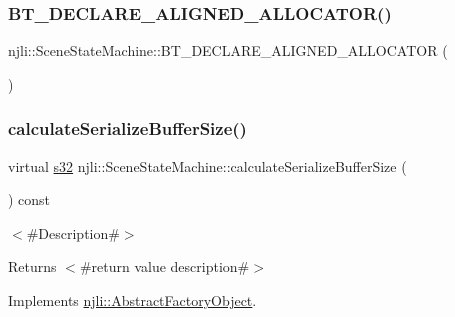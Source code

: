\subsubsection{\texorpdfstring{B\+T\+\_\+\+D\+E\+C\+L\+A\+R\+E\+\_\+\+A\+L\+I\+G\+N\+E\+D\+\_\+\+A\+L\+L\+O\+C\+A\+T\+O\+R()}{BT\_DECLARE\_ALIGNED\_ALLOCATOR()}}
{\footnotesize\ttfamily njli\+::\+Scene\+State\+Machine\+::\+B\+T\+\_\+\+D\+E\+C\+L\+A\+R\+E\+\_\+\+A\+L\+I\+G\+N\+E\+D\+\_\+\+A\+L\+L\+O\+C\+A\+T\+OR (\begin{DoxyParamCaption}{ }\end{DoxyParamCaption})\hspace{0.3cm}{\ttfamily [protected]}}

\mbox{\label{classnjli_1_1_scene_state_machine_a3bea7e481a04e8c938d92bb911072a7d}} 
\subsubsection{\texorpdfstring{calculate\+Serialize\+Buffer\+Size()}{calculateSerializeBufferSize()}}
{\footnotesize\ttfamily virtual \mbox{\hyperlink{_util_8h_aa62c75d314a0d1f37f79c4b73b2292e2}{s32}} njli\+::\+Scene\+State\+Machine\+::calculate\+Serialize\+Buffer\+Size (\begin{DoxyParamCaption}{ }\end{DoxyParamCaption}) const\hspace{0.3cm}{\ttfamily [virtual]}}

$<$\#\+Description\#$>$

\begin{DoxyReturn}{Returns}
$<$\#return value description\#$>$ 
\end{DoxyReturn}


Implements \mbox{\hyperlink{classnjli_1_1_abstract_factory_object_a4763d05bc9dc37c559111f8bb30e1dd8}{njli\+::\+Abstract\+Factory\+Object}}.

\mbox{\label{classnjli_1_1_scene_state_machine_a431d92c00f51476ac4e3734ab4beb8f9}} 
